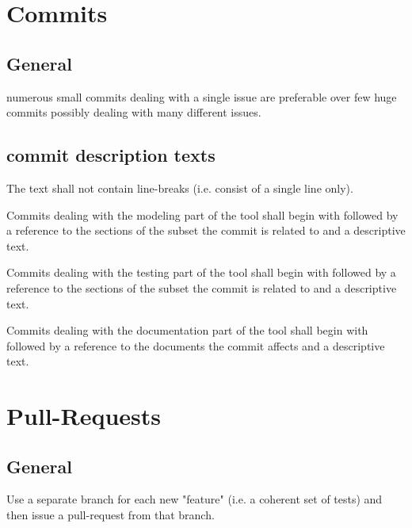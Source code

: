 \documentclass[draft]{efsguide}
\begin{document}
\section{Commits}
\subsection{General}
\begin{rules}
\item \label{rule:smallcommits} numerous small commits dealing with a single issue are preferable over few huge commits possibly dealing with many different issues. 
\end{rules}

\subsection{commit description texts}
\label{rules:committexts}
\begin{rules}
\item The text shall not contain line-breaks (i.e. consist of a single line only). 
\item Commits dealing with the modeling part of the tool shall begin with  followed by a reference to the sections of the subset the commit is related to and a descriptive text. 
\item Commits dealing with the testing part of the tool shall begin with  followed by a reference to the sections of the subset the commit is related to and a descriptive text. 
\item Commits dealing with the documentation part of the tool shall begin with  followed by a reference to the documents the commit affects and a descriptive text. 
\end{rules}


\section{Pull-Requests}
\label{sec:pull_request}
\subsection{General}
\begin{rules}

\item Use a separate branch for each new "feature" (i.e. a coherent set of tests) and then issue a pull-request from that branch. 

\end{rules}
\end{document}
